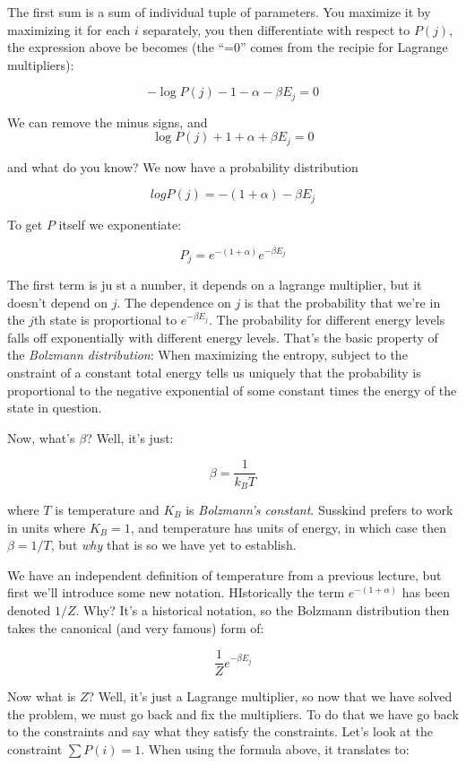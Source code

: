 \documentclass[a4, 12pt, english, USenglish]{scrreprt}
\newcommand{\idx}[1]{{\em #1}\index{#1}}
\begin{document}
The first sum is a sum of individual tuple  of parameters. You maximize
it by maximizing it for each \(i\) separately, you then differentiate
with respect to \(P(j)\), the expression above be becomes (the ``=0''
comes from the recipie for Lagrange multipliers):

\[
     -\log P(j) - 1 - \alpha  - \beta E_j  = 0
\]

We can remove the minus signs, and 
\[
     \log P(j) +   1 + \alpha  + \beta E_j  = 0
\]

and what do you know? We now have a probability distribution

\[
 log P(j) = -( 1+\alpha) - \beta E_j
\]

To get \(P\) itself we exponentiate:

\[
  P_j = e^{-(1 + \alpha) } e^{-\beta E_j}
\]

The first term is ju st a number, it depends on a lagrange multiplier,
but it doesn't depend on \(j\).  The dependence on \(j\) is that the
probability that we're in the \(j\)th state is proportional to
\(e^{-\beta E_j}\).  The probability for different energy levels falls
off exponentially with different energy levels.  That's the basic
property of the \idx{Bolzmann distribution}:  When maximizing the
entropy, subject to the onstraint of a constant total energy tells us
uniquely that the probability is proportional to the negative
exponential of some constant times the energy of the state in question.

Now, what's \(\beta\)? Well, it's just:

\[
  \beta = \frac{1}{k_B T}
\]

where \(T\) is temperature and \(K_B\) is \idx{Bolzmann's constant}.   
Susskind prefers to work in units where \(K_B = 1\), and temperature
has units of energy, in which case then \(\beta = 1/T\), but {\em why} that is so
we have yet to establish.

We have an independent definition of temperature from a previous
lecture, but first we'll introduce some new notation.  HIstorically
the term \(e^{-(1 + \alpha)}\) has been denoted \(1/Z\).  Why? It's a
historical notation, so the Bolzmann distribution then takes the
canonical (and very famous) form of:

\[
\frac{1}{Z} e^{-\beta E_j}
\]

Now what is \(Z\)? Well, it's just a Lagrange multiplier, so now that
we have solved the problem, we must go back and fix the multipliers.
To do that we have go back to the constraints and say what they
satisfy the constraints.  Let's look at the constraint \(\sum P(i) =
1\).  When using the formula above, it translates to:
\end{document}
